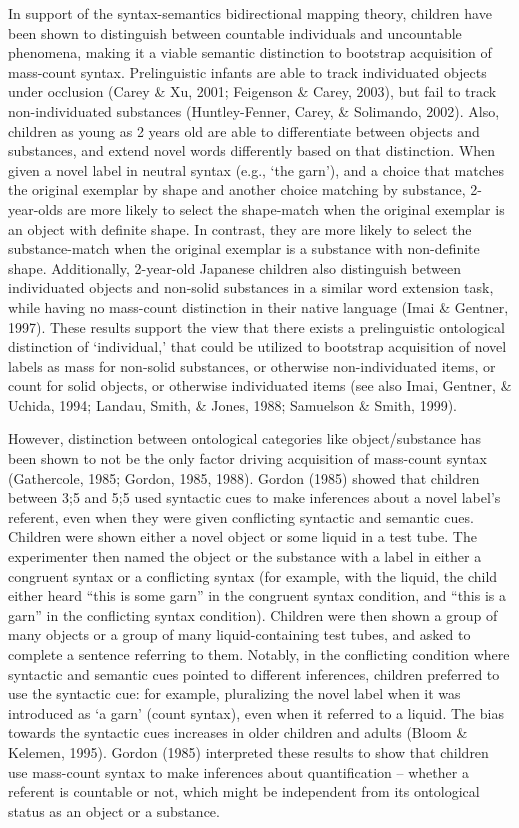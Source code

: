 \documentclass[
  man,floatsintext]{apa6}
\begin{document}
In support of the syntax-semantics bidirectional mapping theory, children have been shown to distinguish between countable individuals and uncountable phenomena, making it a viable semantic distinction to bootstrap acquisition of mass-count syntax. Prelinguistic infants are able to track individuated objects under occlusion (Carey \& Xu, 2001; Feigenson \& Carey, 2003), but fail to track non-individuated substances (Huntley-Fenner, Carey, \& Solimando, 2002). Also, children as young as 2 years old are able to differentiate between objects and substances, and extend novel words differently based on that distinction. When given a novel label in neutral syntax (e.g., `the garn'), and a choice that matches the original exemplar by shape and another choice matching by substance, 2-year-olds are more likely to select the shape-match when the original exemplar is an object with definite shape. In contrast, they are more likely to select the substance-match when the original exemplar is a substance with non-definite shape. Additionally, 2-year-old Japanese children also distinguish between individuated objects and non-solid substances in a similar word extension task, while having no mass-count distinction in their native language (Imai \& Gentner, 1997). These results support the view that there exists a prelinguistic ontological distinction of `individual,' that could be utilized to bootstrap acquisition of novel labels as mass for non-solid substances, or otherwise non-individuated items, or count for solid objects, or otherwise individuated items (see also Imai, Gentner, \& Uchida, 1994; Landau, Smith, \& Jones, 1988; Samuelson \& Smith, 1999).

However, distinction between ontological categories like object/substance has been shown to not be the only factor driving acquisition of mass-count syntax (Gathercole, 1985; Gordon, 1985, 1988). Gordon (1985) showed that children between 3;5 and 5;5 used syntactic cues to make inferences about a novel label's referent, even when they were given conflicting syntactic and semantic cues. Children were shown either a novel object or some liquid in a test tube. The experimenter then named the object or the substance with a label in either a congruent syntax or a conflicting syntax (for example, with the liquid, the child either heard ``this is some garn'' in the congruent syntax condition, and ``this is a garn'' in the conflicting syntax condition). Children were then shown a group of many objects or a group of many liquid-containing test tubes, and asked to complete a sentence referring to them. Notably, in the conflicting condition where syntactic and semantic cues pointed to different inferences, children preferred to use the syntactic cue: for example, pluralizing the novel label when it was introduced as `a garn' (count syntax), even when it referred to a liquid. The bias towards the syntactic cues increases in older children and adults (Bloom \& Kelemen, 1995). Gordon (1985) interpreted these results to show that children use mass-count syntax to make inferences about quantification -- whether a referent is countable or not, which might be independent from its ontological status as an object or a substance.
\end{document}
